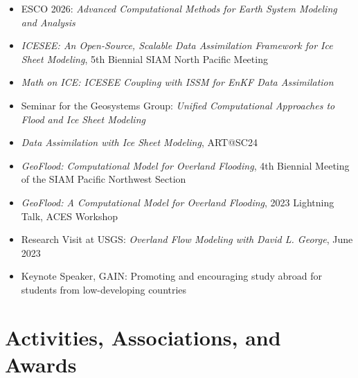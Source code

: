 \documentclass[11pt]{article}
\begin{document}
\begin{itemize}[leftmargin=1.2em, itemsep=2pt, topsep=2pt]

\item ESCO 2026: \textit{Advanced Computational Methods for Earth System Modeling and Analysis}

\item \textit{ICESEE: An Open-Source, Scalable Data Assimilation Framework for Ice Sheet Modeling}, 5th Biennial SIAM North Pacific Meeting

\item \textit{Math on ICE: ICESEE Coupling with ISSM for EnKF Data Assimilation}

\item Seminar for the Geosystems Group: \textit{Unified Computational Approaches to Flood and Ice Sheet Modeling}

\item \textit{Data Assimilation with Ice Sheet Modeling}, ART@SC24

\item \textit{GeoFlood: Computational Model for Overland Flooding}, 4th Biennial Meeting of the SIAM Pacific Northwest Section

\item \textit{GeoFlood: A Computational Model for Overland Flooding}, 2023 Lightning Talk, ACES Workshop

\item Research Visit at USGS: \textit{Overland Flow Modeling with David L. George}, June 2023

\item Keynote Speaker, GAIN: Promoting and encouraging study abroad for students from low-developing countries

\end{itemize}

\section*{Activities, Associations, and Awards}
\end{document}
